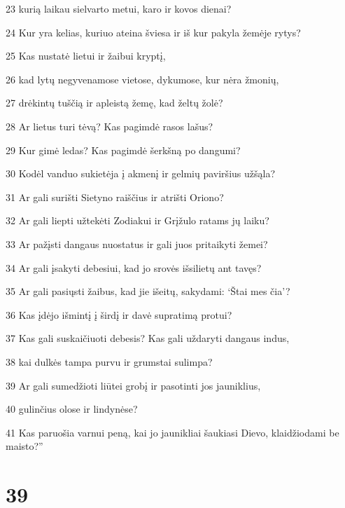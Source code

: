 \par 23 kurią laikau sielvarto metui, karo ir kovos dienai? 
\par 24 Kur yra kelias, kuriuo ateina šviesa ir iš kur pakyla žemėje rytys? 
\par 25 Kas nustatė lietui ir žaibui kryptį, 
\par 26 kad lytų negyvenamose vietose, dykumose, kur nėra žmonių, 
\par 27 drėkintų tuščią ir apleistą žemę, kad želtų žolė? 
\par 28 Ar lietus turi tėvą? Kas pagimdė rasos lašus? 
\par 29 Kur gimė ledas? Kas pagimdė šerkšną po dangumi? 
\par 30 Kodėl vanduo sukietėja į akmenį ir gelmių paviršius užšąla? 
\par 31 Ar gali surišti Sietyno raiščius ir atrišti Oriono? 
\par 32 Ar gali liepti užtekėti Zodiakui ir Grįžulo ratams jų laiku? 
\par 33 Ar pažįsti dangaus nuostatus ir gali juos pritaikyti žemei? 
\par 34 Ar gali įsakyti debesiui, kad jo srovės išsilietų ant tavęs? 
\par 35 Ar gali pasiųsti žaibus, kad jie išeitų, sakydami: ‘Štai mes čia’? 
\par 36 Kas įdėjo išmintį į širdį ir davė supratimą protui? 
\par 37 Kas gali suskaičiuoti debesis? Kas gali uždaryti dangaus indus, 
\par 38 kai dulkės tampa purvu ir grumstai sulimpa? 
\par 39 Ar gali sumedžioti liūtei grobį ir pasotinti jos jauniklius, 
\par 40 gulinčius olose ir lindynėse? 
\par 41 Kas paruošia varnui peną, kai jo jaunikliai šaukiasi Dievo, klaidžiodami be maisto?”



\chapter{39}

